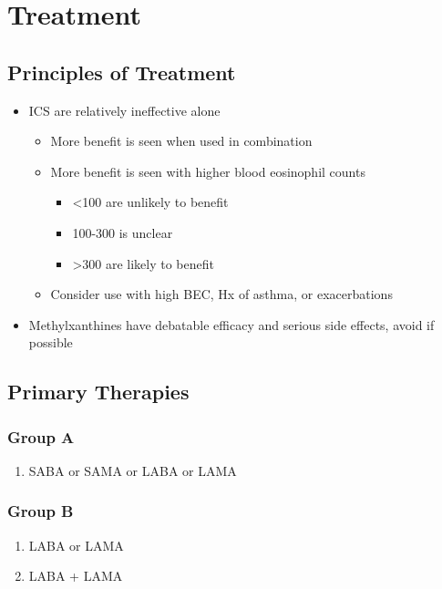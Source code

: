 \documentclass[main.tex]{subfiles}
\begin{document}
\section{Treatment}

\subsection{Principles of Treatment}
\begin{itemize}[noitemsep]
	\item ICS are relatively ineffective alone
	\begin{itemize}[noitemsep]
		\item More benefit is seen when used in combination
		\item More benefit is seen with higher blood eosinophil counts
		\begin{itemize}[noitemsep]
			\item \textless 100 are unlikely to benefit
			\item 100-300 is unclear
			\item \textgreater 300 are likely to benefit
		\end{itemize}
		\item Consider use with high BEC, Hx of asthma, or exacerbations
	\end{itemize}
	\item Methylxanthines have debatable efficacy and serious side effects, avoid if possible
\end{itemize}


\subsection{Primary Therapies}
\subsubsection{Group A}
\begin{enumerate}[noitemsep]
	\item SABA or SAMA or LABA or LAMA
\end{enumerate}

\subsubsection{Group B}
\begin{enumerate}[noitemsep]
	\item LABA or LAMA 
	\item LABA + LAMA
\end{enumerate}
\end{document}
